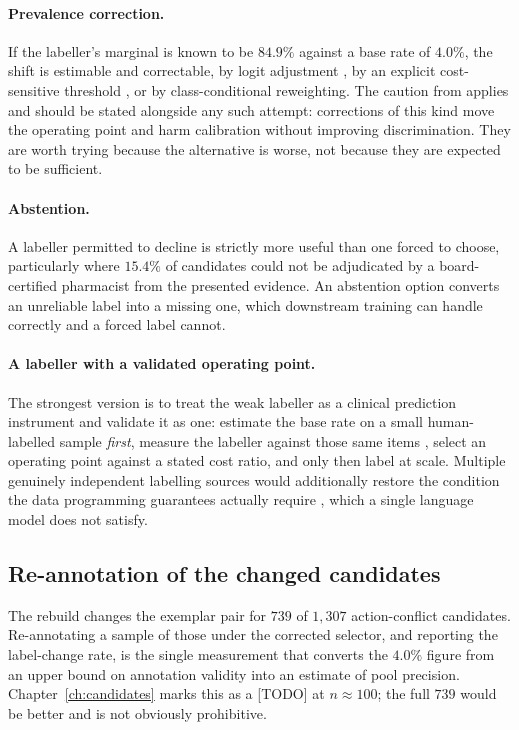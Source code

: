 \paragraph{Prevalence correction.} If the labeller's marginal is known to be
$84.9\%$ against a base rate of $4.0\%$, the shift is estimable and correctable,
by logit adjustment \citep{menon2021logitadjust}, by an explicit cost-sensitive
threshold \citep{elkan2001cost}, or by class-conditional reweighting. The
caution from \citet{vandengoorbergh2022harm} applies and should be stated
alongside any such attempt: corrections of this kind move the operating point
and harm calibration without improving discrimination. They are worth trying
because the alternative is worse, not because they are expected to be
sufficient.

\paragraph{Abstention.} A labeller permitted to decline is strictly more useful
than one forced to choose, particularly where $15.4\%$ of candidates could not be
adjudicated by a board-certified pharmacist from the presented evidence. An
abstention option converts an unreliable label into a missing one, which
downstream training can handle correctly and a forced label cannot.

\paragraph{A labeller with a validated operating point.} The strongest version
is to treat the weak labeller as a clinical prediction instrument and validate
it as one: estimate the base rate on a small human-labelled sample \emph{first},
measure the labeller against those same items \citep{pangakis2023validation},
select an operating point against a stated cost ratio, and only then label at
scale. Multiple genuinely independent labelling sources would additionally
restore the condition the data programming guarantees actually require
\citep{ratner2016dataprogramming,ratner2017snorkel,zhang2022wssurvey}, which a
single language model does not satisfy.

\subsection{Re-annotation of the changed candidates}

The rebuild changes the exemplar pair for $739$ of $1{,}307$ action-conflict
candidates. Re-annotating a sample of those under the corrected selector, and
reporting the label-change rate, is the single measurement that converts the
$4.0\%$ figure from an upper bound on annotation validity into an estimate of
pool precision. Chapter~\ref{ch:candidates} marks this as a [TODO] at
$n \approx 100$; the full $739$ would be better and is not obviously
prohibitive.


